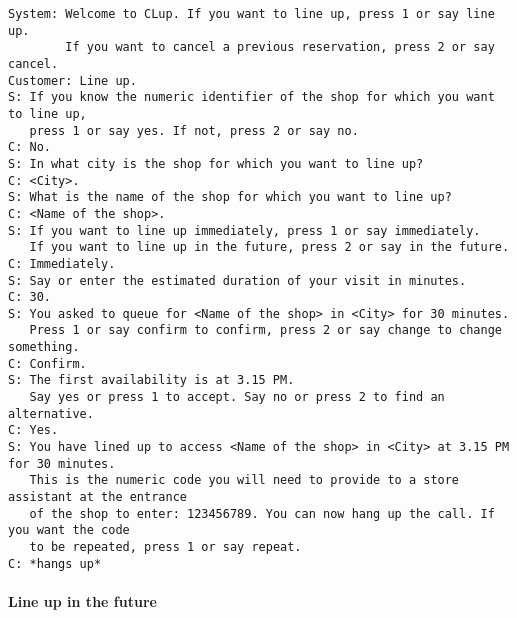 \documentclass[../../main.tex]{subfiles}
\begin{document}
\begin{verbatim}
System: Welcome to CLup. If you want to line up, press 1 or say line up.
        If you want to cancel a previous reservation, press 2 or say cancel.
Customer: Line up.
S: If you know the numeric identifier of the shop for which you want to line up,
   press 1 or say yes. If not, press 2 or say no.
C: No.
S: In what city is the shop for which you want to line up?
C: <City>.
S: What is the name of the shop for which you want to line up?
C: <Name of the shop>.
S: If you want to line up immediately, press 1 or say immediately.
   If you want to line up in the future, press 2 or say in the future.
C: Immediately.
S: Say or enter the estimated duration of your visit in minutes.
C: 30.
S: You asked to queue for <Name of the shop> in <City> for 30 minutes.
   Press 1 or say confirm to confirm, press 2 or say change to change something.
C: Confirm.
S: The first availability is at 3.15 PM.
   Say yes or press 1 to accept. Say no or press 2 to find an alternative.
C: Yes.
S: You have lined up to access <Name of the shop> in <City> at 3.15 PM for 30 minutes.
   This is the numeric code you will need to provide to a store assistant at the entrance
   of the shop to enter: 123456789. You can now hang up the call. If you want the code
   to be repeated, press 1 or say repeat.
C: *hangs up*
\end{verbatim}

\paragraph{Line up in the future}
\end{document}
